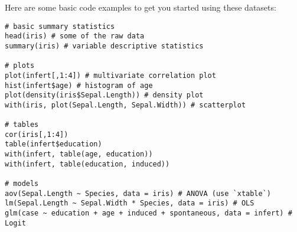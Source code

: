 \documentclass[11pt, a4paper]{article}
\begin{document}
\noindent Here are some basic code examples to get you started using these datasets:

\singlespacing
\begin{verbatim}
# basic summary statistics
head(iris) # some of the raw data
summary(iris) # variable descriptive statistics

# plots
plot(infert[,1:4]) # multivariate correlation plot
hist(infert$age) # histogram of age
plot(density(iris$Sepal.Length)) # density plot
with(iris, plot(Sepal.Length, Sepal.Width)) # scatterplot

# tables
cor(iris[,1:4])
table(infert$education)
with(infert, table(age, education))
with(infert, table(education, induced))

# models
aov(Sepal.Length ~ Species, data = iris) # ANOVA (use `xtable`)
lm(Sepal.Length ~ Sepal.Width * Species, data = iris) # OLS
glm(case ~ education + age + induced + spontaneous, data = infert) # Logit

\end{verbatim}
\end{document}
